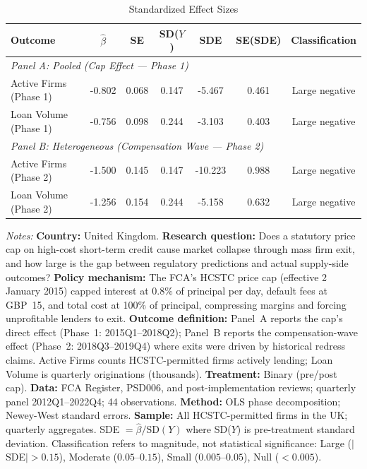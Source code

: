 \begin{table}[t]
\centering
\begin{threeparttable}
\caption{Standardized Effect Sizes}
\label{tab:sde}
\begin{tabular}{lcccccc}
\toprule
Outcome & $\hat{\beta}$ & SE & SD($Y$) & SDE & SE(SDE) & Classification \\
\midrule
\multicolumn{7}{l}{\textit{Panel A: Pooled (Cap Effect --- Phase 1)}} \\
Active Firms (Phase 1) & -0.802 & 0.068 & 0.147 & -5.467 & 0.461 & Large negative \\
Loan Volume (Phase 1) & -0.756 & 0.098 & 0.244 & -3.103 & 0.403 & Large negative \\
\midrule
\multicolumn{7}{l}{\textit{Panel B: Heterogeneous (Compensation Wave --- Phase 2)}} \\
Active Firms (Phase 2) & -1.500 & 0.145 & 0.147 & -10.223 & 0.988 & Large negative \\
Loan Volume (Phase 2) & -1.256 & 0.154 & 0.244 & -5.158 & 0.632 & Large negative \\
\bottomrule
\end{tabular}
\begin{tablenotes}\small
\item \textit{Notes:} \textbf{Country:} United Kingdom. \textbf{Research question:} Does a statutory price cap on high-cost short-term credit cause market collapse through mass firm exit, and how large is the gap between regulatory predictions and actual supply-side outcomes? \textbf{Policy mechanism:} The FCA's HCSTC price cap (effective 2 January 2015) capped interest at 0.8\% of principal per day, default fees at GBP~15, and total cost at 100\% of principal, compressing margins and forcing unprofitable lenders to exit. \textbf{Outcome definition:} Panel~A reports the cap's direct effect (Phase~1: 2015Q1--2018Q2); Panel~B reports the compensation-wave effect (Phase~2: 2018Q3--2019Q4) where exits were driven by historical redress claims. Active Firms counts HCSTC-permitted firms actively lending; Loan Volume is quarterly originations (thousands). \textbf{Treatment:} Binary (pre/post cap). \textbf{Data:} FCA Register, PSD006, and post-implementation reviews; quarterly panel 2012Q1--2022Q4; 44 observations. \textbf{Method:} OLS phase decomposition; Newey-West standard errors. \textbf{Sample:} All HCSTC-permitted firms in the UK; quarterly aggregates. SDE $= \hat{\beta} / \text{SD}(Y)$ where SD($Y$) is pre-treatment standard deviation. Classification refers to magnitude, not statistical significance: Large ($|$SDE$| > 0.15$), Moderate ($0.05$--$0.15$), Small ($0.005$--$0.05$), Null ($< 0.005$).
\end{tablenotes}
\end{threeparttable}
\end{table}
